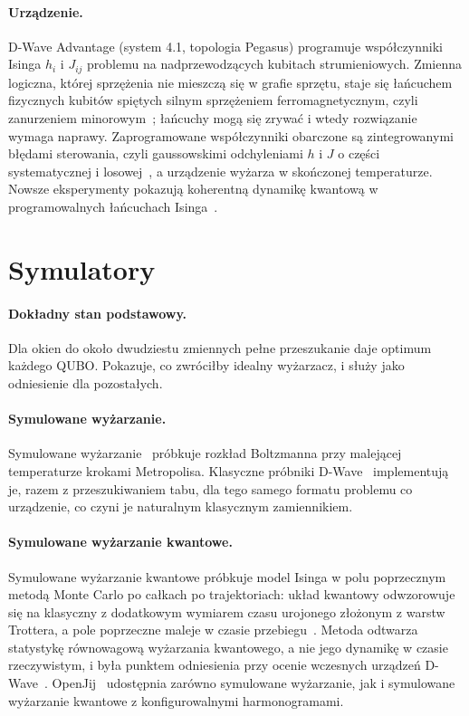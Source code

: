 \documentclass[11pt]{article}
\begin{document}
\paragraph{Urządzenie.}
D-Wave Advantage (system 4.1, topologia Pegasus) programuje współczynniki
Isinga $h_i$ i $J_{ij}$ problemu na nadprzewodzących kubitach strumieniowych.
Zmienna logiczna, której sprzężenia nie mieszczą się w grafie sprzętu, staje
się łańcuchem fizycznych kubitów spiętych silnym sprzężeniem
ferromagnetycznym, czyli zanurzeniem minorowym~\cite{choi2008minor}; łańcuchy
mogą się zrywać i wtedy rozwiązanie wymaga naprawy. Zaprogramowane
współczynniki obarczone są zintegrowanymi błędami sterowania, czyli
gaussowskimi odchyleniami $h$ i $J$ o części systematycznej
i losowej~\cite{dwaveice}, a urządzenie wyżarza w skończonej temperaturze.
Nowsze eksperymenty pokazują koherentną dynamikę kwantową w programowalnych
łańcuchach Isinga~\cite{king2022coherent}.

\section{Symulatory}

\paragraph{Dokładny stan podstawowy.}
Dla okien do około dwudziestu zmiennych pełne przeszukanie daje optimum
każdego QUBO. Pokazuje, co zwróciłby idealny wyżarzacz, i służy jako
odniesienie dla pozostałych.

\paragraph{Symulowane wyżarzanie.}
Symulowane wyżarzanie~\cite{kirkpatrick1983sa} próbkuje rozkład Boltzmanna
przy malejącej temperaturze krokami Metropolisa. Klasyczne próbniki
D-Wave~\cite{dwavesamplers} implementują je, razem z przeszukiwaniem tabu, dla
tego samego formatu problemu co urządzenie, co czyni je naturalnym
klasycznym zamiennikiem.

\paragraph{Symulowane wyżarzanie kwantowe.}
Symulowane wyżarzanie kwantowe próbkuje model Isinga w polu poprzecznym metodą
Monte Carlo po całkach po trajektoriach: układ kwantowy odwzorowuje się na
klasyczny z dodatkowym wymiarem czasu urojonego złożonym z warstw Trottera,
a pole poprzeczne maleje w czasie przebiegu~\cite{santoro2002qa,martonak2002pimc}.
Metoda odtwarza statystykę równowagową wyżarzania kwantowego, a nie jego
dynamikę w czasie rzeczywistym, i była punktem odniesienia przy ocenie
wczesnych urządzeń D-Wave~\cite{boixo2014evidence}. OpenJij~\cite{openjij}
udostępnia zarówno symulowane wyżarzanie, jak i symulowane wyżarzanie
kwantowe z konfigurowalnymi harmonogramami.
\end{document}
